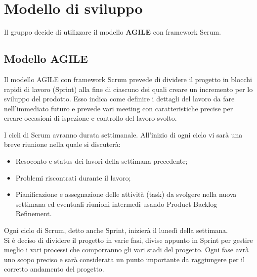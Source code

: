 \section{Modello di sviluppo}
Il gruppo decide di utilizzare il modello \textbf{AGILE} con framework Scrum.

\subsection{Modello AGILE}
Il modello AGILE con framework Scrum prevede di dividere il progetto in blocchi rapidi di lavoro (Sprint) 
alla fine di ciascuno dei quali creare un incremento per lo sviluppo del prodotto. 
Esso indica come definire i dettagli del lavoro da fare nell'immediato futuro e prevede 
vari meeting con caratteristiche precise per creare occasioni di ispezione e controllo del lavoro svolto.

I cicli di Scrum avranno durata settimanale. All'inizio di ogni ciclo vi sarà una breve riunione nella quale si discuterà:
\begin{itemize}
	\item Resoconto e status dei lavori della settimana precedente;
	\item Problemi riscontrati durante il lavoro;
	\item Pianificazione e assegnazione delle attività (task) da svolgere nella nuova settimana ed eventuali riunioni intermedi usando Product Backlog Refinement.
\end{itemize}
Ogni ciclo di Scrum, detto anche Sprint, inizierà il lunedì della settimana.\\
Si è deciso di dividere il progetto in varie fasi, divise appunto in Sprint per gestire meglio i vari processi che comporranno gli vari stadi del progetto. Ogni fase avrà uno scopo preciso e sarà considerata un punto importante da raggiungere per il corretto andamento del progetto.